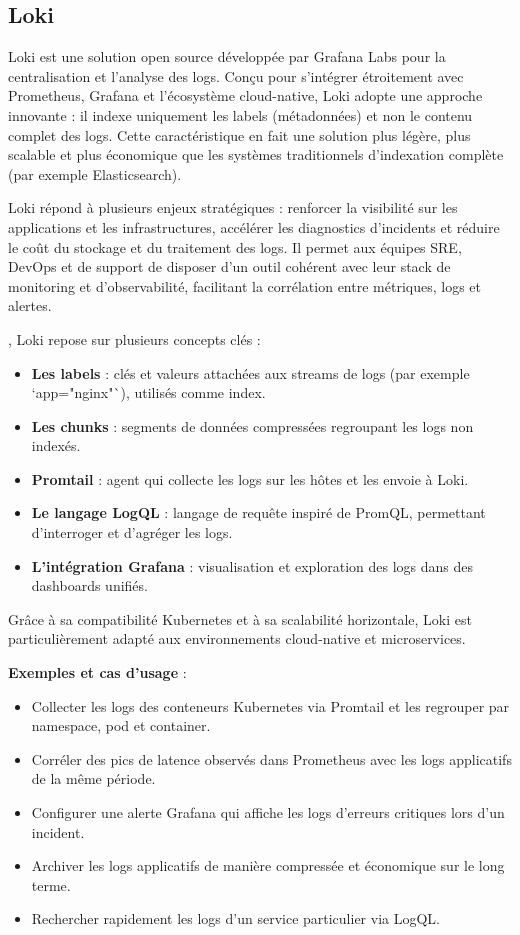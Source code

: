 \subsection{Loki}

Loki est une solution open source développée par Grafana Labs pour la centralisation et l’analyse des logs. Conçu pour s’intégrer étroitement avec Prometheus, Grafana et l’écosystème cloud-native, Loki adopte une approche innovante  : il indexe uniquement les labels (métadonnées) et non le contenu complet des logs. Cette caractéristique en fait une solution plus légère, plus scalable et plus économique que les systèmes traditionnels d’indexation complète (par exemple Elasticsearch).

Loki répond à plusieurs enjeux stratégiques  : renforcer la visibilité sur les applications et les infrastructures, accélérer les diagnostics d’incidents et réduire le coût du stockage et du traitement des logs. Il permet aux équipes SRE, DevOps et de support de disposer d’un outil cohérent avec leur stack de monitoring et d’observabilité, facilitant la corrélation entre métriques, logs et alertes.

, Loki repose sur plusieurs concepts clés  :
\begin{itemize}
	\item \textbf{Les labels}  : clés et valeurs attachées aux streams de logs (par exemple `app="nginx"`), utilisés comme index.
	\item \textbf{Les chunks}  : segments de données compressées regroupant les logs non indexés.
	\item \textbf{Promtail}  : agent qui collecte les logs sur les hôtes et les envoie à Loki.
	\item \textbf{Le langage LogQL}  : langage de requête inspiré de PromQL, permettant d’interroger et d’agréger les logs.
	\item \textbf{L’intégration Grafana}  : visualisation et exploration des logs dans des dashboards unifiés.
\end{itemize}

Grâce à sa compatibilité Kubernetes et à sa scalabilité horizontale, Loki est particulièrement adapté aux environnements cloud-native et microservices.

\textbf{Exemples et cas d’usage} :
\begin{itemize}
	\item Collecter les logs des conteneurs Kubernetes via Promtail et les regrouper par namespace, pod et container.
	\item Corréler des pics de latence observés dans Prometheus avec les logs applicatifs de la même période.
	\item Configurer une alerte Grafana qui affiche les logs d’erreurs critiques lors d’un incident.
	\item Archiver les logs applicatifs de manière compressée et économique sur le long terme.
	\item Rechercher rapidement les logs d’un service particulier via LogQL.
\end{itemize}

